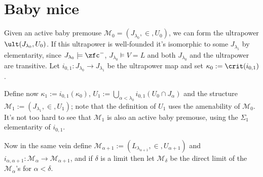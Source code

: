 \section{Baby mice}
Given an active baby premouse $\mathcal M_0=(J_{\lambda_0},\in,U_0)$, we can form the ultrapower $\ult(J_{\lambda_0},U_0)$. If this ultrapower is well-founded it's isomorphic to some $J_{\lambda_1}$ by elementarity, since $J_{\lambda_0}\models\zfc^-$, $J_{\lambda_0}\models V=L$ and both $J_{\lambda_0}$ and the ultrapower are transitive. Let $i_{0,1}:J_{\lambda_0}\to J_{\lambda_1}$ be the ultrapower map and set $\kappa_0:=\crit(i_{0,1})$.

\qquad Define now $\kappa_1:=i_{0,1}(\kappa_0)$, $U_1:=\bigcup_{\alpha<\lambda_0}i_{0,1}(U_0\cap J_\alpha)$ and the structure $\mathcal M_1:=(J_{\lambda_1},\in,U_1)$; note that the definition of $U_1$ uses the amenability of $\mathcal M_0$. It's not too hard to see that $\mathcal M_1$ is also an active baby premouse, using the $\Sigma_1$ elementarity of $i_{0,1}$.

\qquad Now in the same vein define $\mathcal M_{\alpha+1}:=(L_{\lambda_{\alpha+1}},\in,U_{\alpha+1})$ and $i_{\alpha,\alpha+1}:\mathcal M_\alpha\to\mathcal M_{\alpha+1}$, and if $\delta$ is a limit then let $\mathcal M_\delta$ be the direct limit of the $\mathcal M_\alpha$'s for $\alpha<\delta$.



